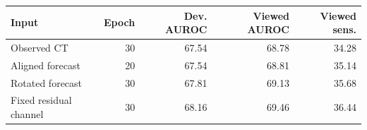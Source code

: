 \begin{tabular}{@{}lrrrr@{}}
\toprule
Input & Epoch & Dev. AUROC & Viewed AUROC & Viewed sens. \\
\midrule
Observed CT & 30 & 67.54 & 68.78 & 34.28 \\
Aligned forecast & 20 & 67.54 & 68.81 & 35.14 \\
Rotated forecast & 30 & 67.81 & 69.13 & 35.68 \\
Fixed residual channel & 30 & 68.16 & 69.46 & 36.44 \\
\bottomrule
\end{tabular}
